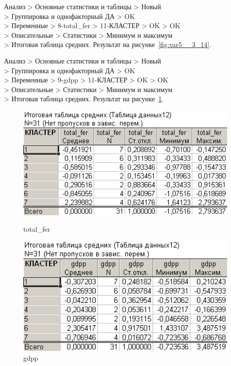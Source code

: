 Анализ > Основные статистики и таблицы > Новый\\
> Группировка и однофакторный ДА > OK\\
> Переменные > 8-total\_fer > 11-КЛАСТЕР > OK > OK\\
> Описательные > Статистики > Минимум и максимум\\
> Итоговая таблица средних. Результат на рисунке~\ref{fig:var5__3_14}.

Анализ > Основные статистики и таблицы > Новый\\
> Группировка и однофакторный ДА > OK\\
> Переменные > 9-gdpp > 11-КЛАСТЕР > OK > OK\\
> Описательные > Статистики > Минимум и максимум\\
> Итоговая таблица средних. Результат на рисунке~\ref{fig:var5__3_15}.

\begin{figure}[!h]
  \centering
  \begin{minipage}{0.49\textwidth}
    \centering

    \includegraphics[width=0.99\textwidth]
    {inc/cars_my/var5__3_14.PNG}

    \caption{total\_fer}
    \label{fig:var5__3_14}
  \end{minipage}
  \begin{minipage}{0.49\textwidth}
    \centering

    \includegraphics[width=0.99\textwidth]
    {inc/cars_my/var5__3_15.PNG}

    \caption{gdpp}
    \label{fig:var5__3_15}
  \end{minipage}
\end{figure}


